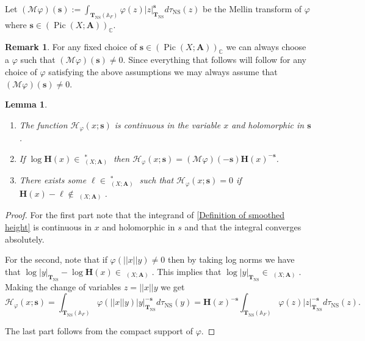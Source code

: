 \documentclass[a4paper,11pt,reqno]{amsart}
\newcommand{\C}{\mathbb{C}}
\newcommand{\A}{\mathbb{A}}
\DeclareMathOperator{\Pic}{Pic}
\DeclareMathOperator{\NS}{NS}
\DeclareMathOperator{\Eff}{\overline{Eff}}
\newtheorem{lemma}[theorem]{Lemma}
\theoremstyle{definition}
\newtheorem{remark}[theorem]{Remark}
\begin{document}
Let $(\mathcal{M} \varphi)(\bm{s}):= \int_{\mathbf{T}_{\NS}(\A_F)} \varphi(z) |z|_{\mathbf{T}_{\NS}}^{\bm{s}} d \tau_{\NS}(z)$ be the Mellin transform of $\varphi$ where $\bm{s} \in (\Pic (X ; \mathbf{A}))_{\C}$.
\begin{remark}\label{rem:Can choose Mellin of phi to be non-zero}
	For any fixed choice of $\bm{s} \in (\Pic (X ; \mathbf{A}))_{\C}$ we can always choose a $\varphi$ such that $(\mathcal{M} \varphi)(\bm{s}) \neq 0$. Since everything that follows will follow for any choice of $\varphi$ satisfying the above assumptions we may always assume that $(\mathcal{M} \varphi)(\bm{s}) \neq 0$.
\end{remark}
\begin{lemma} \hfill 
	\begin{enumerate}
		\item The function $\mathcal{H}_{\varphi}(x; \bm{s})$ is continuous in the variable $x$ and holomorphic in $\bm{s}$.
		\item If $\log \mathbf{H}(x) \in \Eff_{(X; \mathbf{A})}^*$ then $\mathcal{H}_{\varphi}(x; \bm{s}) = (\mathcal{M} \varphi)(-\bm{s}) \mathbf{H}(x)^{ -\bm{s}}$.
		\item There exists some $\ell \in \Eff_{(X; \mathbf{A})}^*$ such that $\mathcal{H}_{\varphi}(x; \bm{s}) = 0$ if $\mathbf{H}(x) - \ell \not \in \Eff_{(X ; \mathbf{A})}$.
	\end{enumerate}
	\label{Properties of smoothed height function}
\end{lemma}
\begin{proof}
	For the first part note that the integrand of \eqref{Definition of smoothed height} is continuous in $x$ and holomorphic in $s$ and that the integral converges absolutely. 
	
	For the second, note that if $\varphi(||x|| y) \neq 0$ then by taking log norms we have that $\log |y|_{\mathbf{T}_{\NS}} - \log \mathbf{H}(x) \in \Eff_{(X ; \mathbf{A})}$. This implies that $\log |y|_{\mathbf{T}_{\NS}} \in \Eff_{(X ; \mathbf{A})}$. Making the change of variables $z = ||x|| y$ we get
	\begin{equation*}
		\mathcal{H}_{\varphi}(x; \bm{s}) = \int_{\mathbf{T}_{\NS}(\A_F)} \varphi(||x|| y) |y|_{\mathbf{T}_{\NS}}^{- \bm{s}} d \tau_{\NS}(y) = \mathbf{H}(x)^{- \bm{s}} \int_{\mathbf{T}_{\NS}(\A_F)} \varphi(z) |z|_{\mathbf{T}_{\NS}}^{- \bm{s}} d \tau_{\NS}(z).
	\end{equation*}
	
	The last part follows from the compact support of $\varphi$.
\end{proof}
\end{document}
